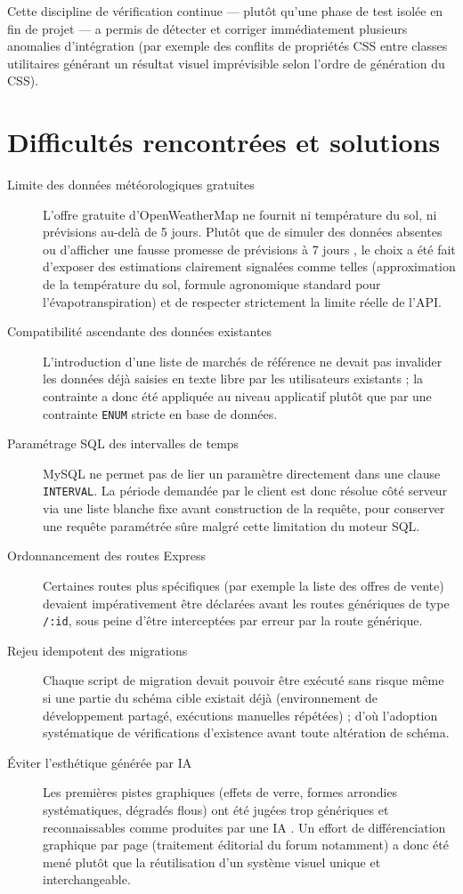 \documentclass[12pt,a4paper]{report}
\begin{document}
Cette discipline de vérification continue --- plutôt qu'une phase de test isolée en fin de projet --- a permis de détecter et corriger immédiatement plusieurs anomalies d'intégration (par exemple des conflits de propriétés CSS entre classes utilitaires générant un résultat visuel imprévisible selon l'ordre de génération du CSS).

\chapter{Difficultés rencontrées et solutions}
\label{chap:difficultes}

\begin{description}
    \item[Limite des données météorologiques gratuites] L'offre gratuite d'OpenWeatherMap ne fournit ni température du sol, ni prévisions au-delà de 5 jours. Plutôt que de simuler des données absentes ou d'afficher une fausse promesse de \og prévisions à 7 jours \fg{}, le choix a été fait d'exposer des estimations clairement signalées comme telles (approximation de la température du sol, formule agronomique standard pour l'évapotranspiration) et de respecter strictement la limite réelle de l'API.
    \item[Compatibilité ascendante des données existantes] L'introduction d'une liste de marchés de référence ne devait pas invalider les données déjà saisies en texte libre par les utilisateurs existants ; la contrainte a donc été appliquée au niveau applicatif plutôt que par une contrainte \texttt{ENUM} stricte en base de données.
    \item[Paramétrage SQL des intervalles de temps] MySQL ne permet pas de lier un paramètre directement dans une clause \texttt{INTERVAL}. La période demandée par le client est donc résolue côté serveur via une liste blanche fixe avant construction de la requête, pour conserver une requête paramétrée sûre malgré cette limitation du moteur SQL.
    \item[Ordonnancement des routes Express] Certaines routes plus spécifiques (par exemple la liste des offres de vente) devaient impérativement être déclarées avant les routes génériques de type \texttt{/:id}, sous peine d'être interceptées par erreur par la route générique.
    \item[Rejeu idempotent des migrations] Chaque script de migration devait pouvoir être exécuté sans risque même si une partie du schéma cible existait déjà (environnement de développement partagé, exécutions manuelles répétées) ; d'où l'adoption systématique de vérifications d'existence avant toute altération de schéma.
    \item[Éviter l'esthétique \og générée par IA \fg{}] Les premières pistes graphiques (effets de verre, formes arrondies systématiques, dégradés flous) ont été jugées trop génériques et reconnaissables comme \og produites par une IA \fg{}. Un effort de différenciation graphique par page (traitement éditorial du forum notamment) a donc été mené plutôt que la réutilisation d'un système visuel unique et interchangeable.
\end{description}
\end{document}
